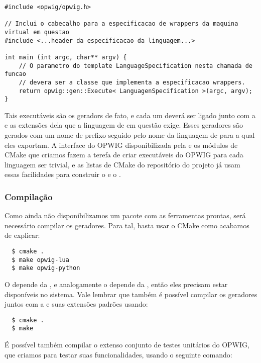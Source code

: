 \begin{lstlisting}
#include <opwig/opwig.h>

// Inclui o cabecalho para a especificacao de wrappers da maquina virtual em questao
#include <...header da especificacao da linguagem...>

int main (int argc, char** argv) {
    // O parametro do template LanguageSpecification nesta chamada de funcao
    // devera ser a classe que implementa a especificacao wrappers.
    return opwig::gen::Execute< LanguagenSpecification >(argc, argv);
}
\end{lstlisting}


Tais executáveis são os geradors de fato, e cada um deverá ser ligado junto com a
 e as extensões dela que a linguagem de \script{} em questão exige. 
Esses geradores são gerados com um nome de prefixo  seguido pelo nome da
linguagem de \script{} para a qual eles exportam. A interface do
OPWIG disponibilizada pela  e os módulos de CMake que criamos fazem a
terefa de criar executáveis do OPWIG para cada linguagem ser trivial, e as listas de CMake
do repositório do projeto já usam essas facilidades para construir o 
e o .

\subsubsection{Compilação}
Como ainda não disponibilizamos um pacote com as ferramentas prontas, será necessário
compilar os geradores. Para tal, basta usar o CMake como acabamos de explicar:

\begin{verbatim}
  $ cmake .
  $ make opwig-lua
  $ make opwig-python
\end{verbatim}


O  depende da , e analogamente o 
depende da , então eles precisam estar disponíveis no sistema.
Vale lembrar que também é possível compilar os geradores juntos com a
 e suas extensões padrões usando:

\begin{verbatim}
  $ cmake .
  $ make
\end{verbatim}

É possível também compilar o extenso conjunto de testes unitários do OPWIG, que
criamos para testar suas funcionalidades, usando o seguinte comando:

